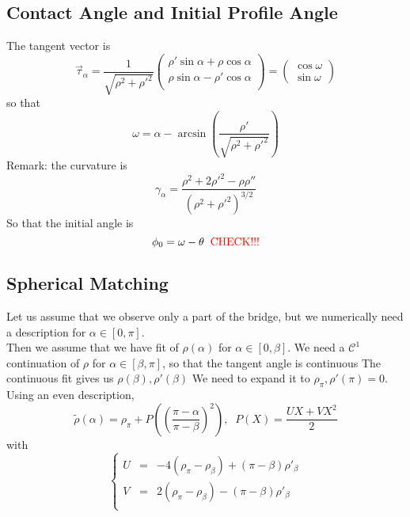 \documentclass[aps,onecolumn]{revtex4}
\begin{document}
\subsection{Contact Angle and Initial Profile Angle}
The   tangent vector is
\begin{equation}
	\vec{\tau}_\alpha = 
	\dfrac{1}{\sqrt{\rho^2+\rho'^2}}
	\begin{pmatrix}
		\rho'\sin\alpha+\rho\cos\alpha\\
		\rho\sin\alpha - \rho'\cos\alpha\\
	\end{pmatrix}
 = 
 	\begin{pmatrix}
	\cos\omega\\
	\sin\omega
	\end{pmatrix}
\end{equation}
so that
\begin{equation}
	\omega = \alpha - \arcsin\left(\dfrac{\rho'}{\sqrt{\rho^2+\rho'^2}}\right)
\end{equation}
Remark: the curvature is
\begin{equation}
	\gamma_\alpha = \dfrac{\rho^2 + 2\rho'^2 - \rho\rho''}{\left(\rho^2+\rho'^2\right)^{3/2}}
\end{equation}
So that the initial angle is
\begin{equation}
	\phi_0 = \omega - \theta \;\; \text{\textcolor{red}{CHECK!!!}}
\end{equation}


\subsection{Spherical Matching}
Let us assume that we observe only a part of the bridge, but we numerically need
a description for $\alpha\in[0,\pi]$.\\

Then we assume that we have fit of $\rho(\alpha)$ for $\alpha\in[0,\beta]$.
We need a $\mathcal{C}^1$ continuation of $\rho$ for $\alpha\in[\beta,\pi]$, so
that the tangent angle is continuous
The continuous fit gives us $\rho(\beta),\rho'(\beta)$
We need to expand it to $\rho_\pi,\rho'(\pi)=0$.
Using an even description,
\begin{equation}
	\tilde{\rho}(\alpha) = \rho_\pi + P\left( \left(\dfrac{\pi-\alpha}{\pi-\beta}\right)^2 \right)
	, \;\; P(X) = \dfrac{UX+VX^2}{2}
\end{equation}
with
\begin{equation}
\left\lbrace
	\begin{array}{rcl}
	U & = & -4\left(\rho_\pi-\rho_\beta\right)+\left(\pi-\beta\right) \rho'_\beta\\
	V & = & 2\left(\rho_\pi-\rho_\beta\right)-\left(\pi-\beta\right) \rho'_\beta \\
	\end{array}
\right.
\end{equation}
\end{document}
